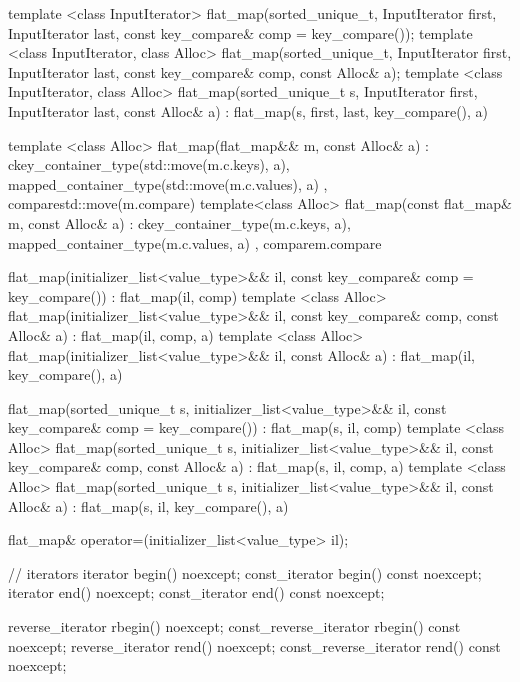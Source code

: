\begin{codeblock}
\begin{codeblock}
\begin{codeblock}
\begin{addedblock}
\begin{codeblock}
{{    template <class InputIterator>
      flat_map(sorted_unique_t, InputIterator first, InputIterator last,
               const key_compare& comp = key_compare());
    template <class InputIterator, class Alloc>
      flat_map(sorted_unique_t, InputIterator first, InputIterator last,
               const key_compare& comp, const Alloc& a);
    template <class InputIterator, class Alloc>
      flat_map(sorted_unique_t s, InputIterator first, InputIterator last,
               const Alloc& a)
        : flat_map(s, first, last, key_compare(), a) { }

    template <class Alloc>
      flat_map(flat_map&& m, const Alloc& a)
        : c{key_container_type(std::move(m.c.keys), a),
            mapped_container_type(std::move(m.c.values), a)}
        , compare{std::move(m.compare)}
      { }
    template<class Alloc>
      flat_map(const flat_map& m, const Alloc& a)
        : c{key_container_type(m.c.keys, a),
            mapped_container_type(m.c.values, a)}
        , compare{m.compare}
      { }

    flat_map(initializer_list<value_type>&& il,
             const key_compare& comp = key_compare())
        : flat_map(il, comp) { }
    template <class Alloc>
      flat_map(initializer_list<value_type>&& il,
               const key_compare& comp, const Alloc& a)
        : flat_map(il, comp, a) { }
    template <class Alloc>
      flat_map(initializer_list<value_type>&& il, const Alloc& a)
        : flat_map(il, key_compare(), a) { }

    flat_map(sorted_unique_t s, initializer_list<value_type>&& il,
             const key_compare& comp = key_compare())
        : flat_map(s, il, comp) { }
    template <class Alloc>
      flat_map(sorted_unique_t s, initializer_list<value_type>&& il,
               const key_compare& comp, const Alloc& a)
        : flat_map(s, il, comp, a) { }
    template <class Alloc>
      flat_map(sorted_unique_t s, initializer_list<value_type>&& il,
               const Alloc& a)
        : flat_map(s, il, key_compare(), a) { }

    flat_map& operator=(initializer_list<value_type> il);

    // iterators
    iterator                begin() noexcept;
    const_iterator          begin() const noexcept;
    iterator                end() noexcept;
    const_iterator          end() const noexcept;

    reverse_iterator        rbegin() noexcept;
    const_reverse_iterator  rbegin() const noexcept;
    reverse_iterator        rend() noexcept;
    const_reverse_iterator  rend() const noexcept;

}}
\end{codeblock}
\end{addedblock}
\end{codeblock}
\end{codeblock}
\end{codeblock}

